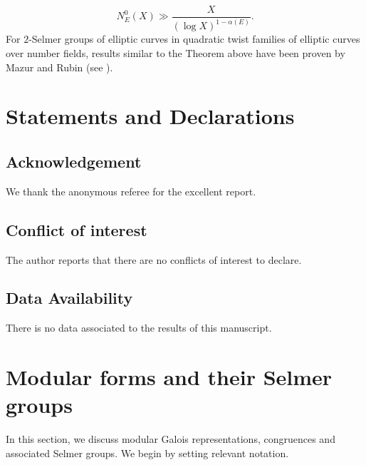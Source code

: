 \documentclass[table]{amsart}
\numberwithin{equation}{section}
\begin{document}
$$
N_E^0(X) \gg \frac{X}{(\log X)^{1 - \alpha(E)}}.
$$
\noindent For $2$-Selmer groups of elliptic curves in quadratic twist families of elliptic curves over number fields, results similar to the Theorem above have been proven by Mazur and Rubin (see \cite[Theorem 1.4]{MRH10}).


\section*{Statements and Declarations}
\subsection*{Acknowledgement}
We thank the anonymous referee for the excellent report.
\subsection*{Conflict of interest} The author reports that there are no conflicts of interest to declare.

\subsection*{Data Availability} There is no data associated to the results of this manuscript.  





\section{Modular forms and their Selmer groups}

\par In this section, we discuss modular Galois representations, congruences and associated Selmer groups. We begin by setting relevant notation.
\end{document}
